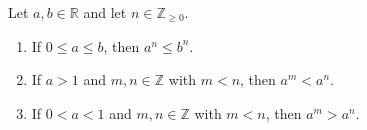 \begin{lemma} \label{lemma:integer_powers_of_positive_reals_are_monotic}
    Let $a,b \in \mathbb{R}$ and let $n \in \mathbb{Z}_{\geq 0}$.
    \begin{enumerate}
        \item If $0 \leq a \leq b$, then $a^n \leq b^n$.
        \item If $a > 1$ and $m,n \in \mathbb{Z}$ with $m < n$, then $a^m < a^n$.
        \item If $0 < a < 1$ and $m,n \in \mathbb{Z}$ with $m < n$, then $a^m > a^n$.
    \end{enumerate}
\end{lemma}

